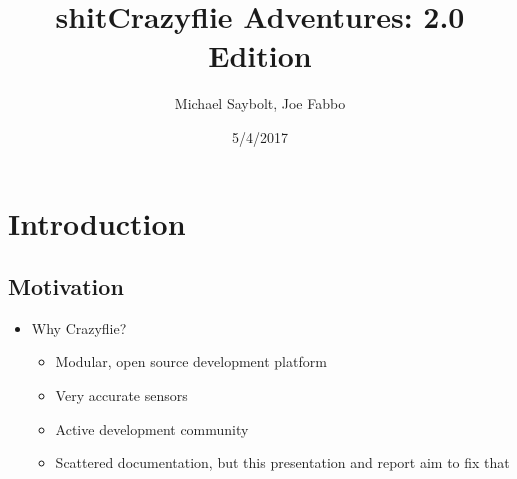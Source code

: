 \documentclass[12pt]{article}
\begin{document}
\title{shit}
\title{Crazyflie Adventures: 2.0 Edition}
\author{Michael Saybolt, Joe Fabbo}
\date{5/4/2017}
\maketitle
\pagebreak

	\tableofcontents
\pagebreak


\section{Introduction}
\subsection{Motivation}
	\begin{itemize}
		\item{Why Crazyflie?}
		\begin{itemize}
			\item Modular, open source development platform
			\item Very accurate sensors
			\item Active development community
			\item Scattered documentation, but this presentation and report aim to fix that
		\end{itemize}
	\end{itemize} %
\end{document}
